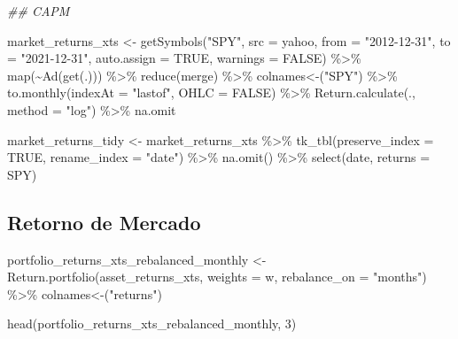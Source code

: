 \documentclass[
  letterpaper,
  DIV=11,
  numbers=noendperiod]{scrartcl}
\newenvironment{Shaded}{\begin{snugshade}}{\end{snugshade}}
\newcommand{\AttributeTok}[1]{\textcolor[rgb]{0.40,0.45,0.13}{#1}}
\newcommand{\ConstantTok}[1]{\textcolor[rgb]{0.56,0.35,0.01}{#1}}
\newcommand{\DecValTok}[1]{\textcolor[rgb]{0.68,0.00,0.00}{#1}}
\newcommand{\DocumentationTok}[1]{\textcolor[rgb]{0.37,0.37,0.37}{\textit{#1}}}
\newcommand{\FunctionTok}[1]{\textcolor[rgb]{0.28,0.35,0.67}{#1}}
\newcommand{\NormalTok}[1]{\textcolor[rgb]{0.00,0.23,0.31}{#1}}
\newcommand{\OtherTok}[1]{\textcolor[rgb]{0.00,0.23,0.31}{#1}}
\newcommand{\SpecialCharTok}[1]{\textcolor[rgb]{0.37,0.37,0.37}{#1}}
\newcommand{\StringTok}[1]{\textcolor[rgb]{0.13,0.47,0.30}{#1}}
\begin{document}
\begin{Shaded}
\begin{Highlighting}[]
\DocumentationTok{\#\# CAPM}

\NormalTok{market\_returns\_xts }\OtherTok{\textless{}{-}}
  \FunctionTok{getSymbols}\NormalTok{(}\StringTok{"SPY"}\NormalTok{,}
             \AttributeTok{src =} \StringTok{\textquotesingle{}yahoo\textquotesingle{}}\NormalTok{,}
             \AttributeTok{from =} \StringTok{"2012{-}12{-}31"}\NormalTok{,}
             \AttributeTok{to =} \StringTok{"2021{-}12{-}31"}\NormalTok{,}
             \AttributeTok{auto.assign =} \ConstantTok{TRUE}\NormalTok{,}
             \AttributeTok{warnings =} \ConstantTok{FALSE}\NormalTok{) }\SpecialCharTok{\%\textgreater{}\%}
  \FunctionTok{map}\NormalTok{(}\SpecialCharTok{\textasciitilde{}}\FunctionTok{Ad}\NormalTok{(}\FunctionTok{get}\NormalTok{(.))) }\SpecialCharTok{\%\textgreater{}\%}
  \FunctionTok{reduce}\NormalTok{(merge) }\SpecialCharTok{\%\textgreater{}\%}
  \StringTok{\textasciigrave{}}\AttributeTok{colnames\textless{}{-}}\StringTok{\textasciigrave{}}\NormalTok{(}\StringTok{"SPY"}\NormalTok{) }\SpecialCharTok{\%\textgreater{}\%}
  \FunctionTok{to.monthly}\NormalTok{(}\AttributeTok{indexAt =} \StringTok{"lastof"}\NormalTok{,}
             \AttributeTok{OHLC =} \ConstantTok{FALSE}\NormalTok{) }\SpecialCharTok{\%\textgreater{}\%}
  \FunctionTok{Return.calculate}\NormalTok{(.,}
                   \AttributeTok{method =} \StringTok{"log"}\NormalTok{) }\SpecialCharTok{\%\textgreater{}\%}
\NormalTok{  na.omit}

\NormalTok{market\_returns\_tidy }\OtherTok{\textless{}{-}}
\NormalTok{  market\_returns\_xts }\SpecialCharTok{\%\textgreater{}\%}
  \FunctionTok{tk\_tbl}\NormalTok{(}\AttributeTok{preserve\_index =} \ConstantTok{TRUE}\NormalTok{,}
         \AttributeTok{rename\_index =} \StringTok{"date"}\NormalTok{) }\SpecialCharTok{\%\textgreater{}\%}
  \FunctionTok{na.omit}\NormalTok{() }\SpecialCharTok{\%\textgreater{}\%}
  \FunctionTok{select}\NormalTok{(date, }\AttributeTok{returns =}\NormalTok{ SPY)}
\end{Highlighting}
\end{Shaded}

\subsection{Retorno de Mercado}\label{retorno-de-mercado-1}

\begin{Shaded}
\begin{Highlighting}[]
\NormalTok{portfolio\_returns\_xts\_rebalanced\_monthly }\OtherTok{\textless{}{-}}
  \FunctionTok{Return.portfolio}\NormalTok{(asset\_returns\_xts,}
                   \AttributeTok{weights =}\NormalTok{ w,}
                   \AttributeTok{rebalance\_on =} \StringTok{"months"}\NormalTok{) }\SpecialCharTok{\%\textgreater{}\%}
  \StringTok{\textasciigrave{}}\AttributeTok{colnames\textless{}{-}}\StringTok{\textasciigrave{}}\NormalTok{(}\StringTok{"returns"}\NormalTok{)}

\FunctionTok{head}\NormalTok{(portfolio\_returns\_xts\_rebalanced\_monthly, }\DecValTok{3}\NormalTok{)}
\end{Highlighting}
\end{Shaded}
\end{document}
